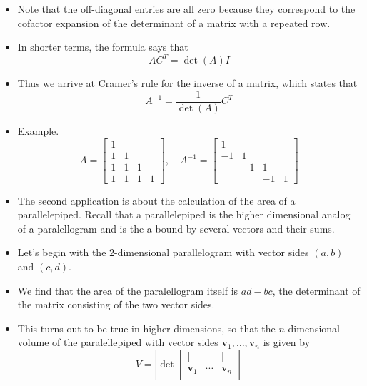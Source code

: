 \documentclass[11pt,oneside]{amsbook}
\theoremstyle{definition}
\theoremstyle{plain}
\theoremstyle{definition}
\theoremstyle{remark}
\numberwithin{equation}{section}
\numberwithin{figure}{section}
\begin{document}
\begin{itemize}
\item Note that the off-diagonal entries are all zero because they correspond to the cofactor expansion of the determinant of a matrix with a repeated row.
\item In shorter terms, the formula says that
  \[AC^T=\det(A)I
  \]
\item Thus we arrive at Cramer's rule for the inverse of a matrix, which states that
  \[A^{-1}=\frac{1}{\det(A)}C^T
  \]
\item Example.
  \[A=\begin{bmatrix}1\\1&1\\1&1&1\\1&1&1&1\end{bmatrix},\quad
    A^{-1}=\begin{bmatrix}1\\-1&1\\&-1&1\\&&-1&1\end{bmatrix}
  \]
\item The second application is about the calculation of the area of a parallelepiped. Recall that a parallelepiped is the higher dimensional analog of a paralellogram and is the a bound by several vectors and their sums.
\item Let's begin with the $2$-dimensional parallelogram with vector sides $(a,b)$ and $(c,d)$.
  \begin{center}
  \end{center}
\item We find that the area of the paralellogram itself is $ad-bc$, the determinant of the matrix consisting of the two vector sides.
\item This turns out to be true in higher dimensions, so that the $n$-dimensional volume of the paralellepiped with vector sides $\mathbf{v}_1,\ldots,\mathbf{v}_n$ is given by
  \[V=\left|\det\begin{bmatrix}
        |&&|\\
        \mathbf{v}_1&\cdots&\mathbf{v}_n\\

\end{bmatrix}\]
\end{itemize}
\end{document}
